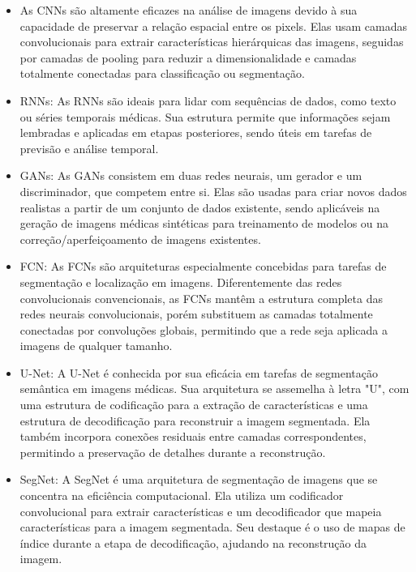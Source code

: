 \begin{itemize}

    \item As \acp{CNN} são altamente eficazes na análise de imagens devido à sua capacidade de preservar a relação espacial entre os pixels. Elas usam camadas convolucionais para extrair características hierárquicas das imagens, seguidas por camadas de pooling para reduzir a dimensionalidade e camadas totalmente conectadas para classificação ou segmentação.

    \item \acp{RNN}: As \acp{RNN} são ideais para lidar com sequências de dados, como texto ou séries temporais médicas. Sua estrutura permite que informações sejam lembradas e aplicadas em etapas posteriores, sendo úteis em tarefas de previsão e análise temporal.

    \item \acp{GAN}: As \acp{GAN} consistem em duas redes neurais, um gerador e um discriminador, que competem entre si. Elas são usadas para criar novos dados realistas a partir de um conjunto de dados existente, sendo aplicáveis na geração de imagens médicas sintéticas para treinamento de modelos ou na correção/aperfeiçoamento de imagens existentes.

    \item \ac{FCN}: As \ac{FCN}s são arquiteturas especialmente concebidas para tarefas de segmentação e localização em imagens. Diferentemente das redes convolucionais convencionais, as \ac{FCN}s mantêm a estrutura completa das redes neurais convolucionais, porém substituem as camadas totalmente conectadas por convoluções globais, permitindo que a rede seja aplicada a imagens de qualquer tamanho.

    \item \ac{U-Net}: A \ac{U-Net} é conhecida por sua eficácia em tarefas de segmentação semântica em imagens médicas. Sua arquitetura se assemelha à letra "U", com uma estrutura de codificação para a extração de características e uma estrutura de decodificação para reconstruir a imagem segmentada. Ela também incorpora conexões residuais entre camadas correspondentes, permitindo a preservação de detalhes durante a reconstrução.

    \item \ac{SegNet}: A \ac{SegNet} é uma arquitetura de segmentação de imagens que se concentra na eficiência computacional. Ela utiliza um codificador convolucional para extrair características e um decodificador que mapeia características para a imagem segmentada. Seu destaque é o uso de mapas de índice durante a etapa de decodificação, ajudando na reconstrução da imagem.


\end{itemize}
